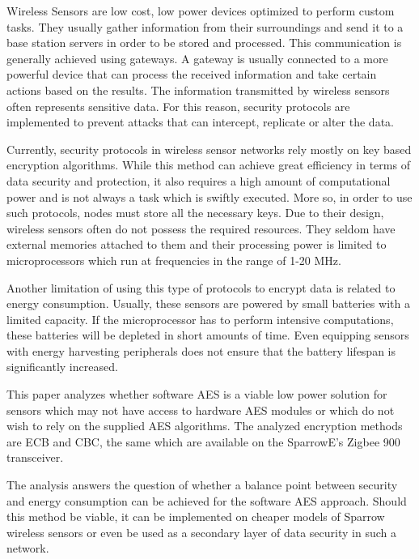 Wireless Sensors are low cost, low power devices optimized to perform custom tasks. They usually
gather information from their surroundings and send it to a base station servers in order
to be stored and processed. This communication is generally achieved using gateways. A
gateway is usually connected to a more powerful device that can process the received information and take certain actions based on the results. 
The information transmitted by wireless sensors often represents sensitive data. For this reason, security protocols are implemented to 
prevent attacks that can intercept, replicate or alter the data.

Currently, security protocols in wireless sensor networks rely mostly on key based encryption algorithms. While this method can achieve 
great efficiency in terms of data security and protection, it also requires a high amount of computational power and is not 
always a task which is swiftly executed. More so, in order to use such protocols, nodes must store all the necessary keys.
Due to their design, wireless sensors often do not possess the required resources. They seldom have external memories attached 
to them and their processing power is limited to microprocessors which run at frequencies in the range of 1-20 MHz.

Another limitation of using this type of protocols to encrypt data is related to energy consumption. Usually, these sensors are 
powered by small batteries with a limited capacity. If the microprocessor has to perform intensive computations, these batteries 
will be depleted in short amounts of time. Even equipping sensors with energy harvesting peripherals does not ensure that 
the battery lifespan is significantly increased.

This paper analyzes whether software AES is a viable low power solution for sensors which may not have access to hardware AES modules 
or which do not wish to rely on the supplied AES algorithms. The analyzed encryption methods are ECB and CBC, the same which are 
available on the SparrowE's Zigbee 900 transceiver.

The analysis answers the question of whether a balance point between security and energy consumption can be achieved for the software AES approach. 
Should this method be viable, it can be implemented on cheaper models of Sparrow wireless sensors or even be used as a secondary layer of data security 
in such a network.
